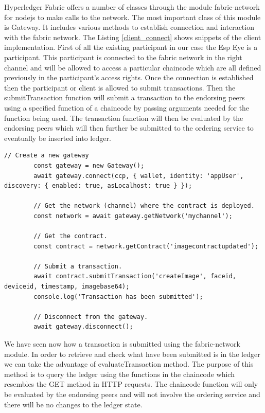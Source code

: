 Hyperledger Fabric offers a number of classes through the module {\selectfont fabric-network} for nodejs to make calls to the network. The most important class of this module is {\selectfont Gateway}. It includes various methods to establish connection and interaction with the fabric network. The Listing \ref{client_connect} shows snippets of the client implementation. First of all the existing participant in our case the Esp Eye is a participant. This participant is connected to the fabric network in the right channel and will be allowed to access a particular chaincode which are all defined previously in the participant's access rights. Once the connection is established then the participant or client is allowed to submit transactions. Then the {\selectfont submitTransaction} function will submit a transaction to the endorsing peers using a specified function of a chaincode by passing arguments needed for the function being used.  The transaction function will then be evaluated by the endorsing peers which will then further be submitted to the ordering service to eventually be inserted into ledger. 


\begin{lstlisting}[caption={Client establishing the connection and submitting a transaction.},label=client_connect, captionpos=b]
        // Create a new gateway 
        const gateway = new Gateway();
        await gateway.connect(ccp, { wallet, identity: 'appUser', discovery: { enabled: true, asLocalhost: true } });

        // Get the network (channel) where the contract is deployed.
        const network = await gateway.getNetwork('mychannel');

        // Get the contract.
        const contract = network.getContract('imagecontractupdated');

        // Submit a transaction.
        await contract.submitTransaction('createImage', faceid, deviceid, timestamp, imagebase64);
        console.log('Transaction has been submitted');

        // Disconnect from the gateway.
        await gateway.disconnect();
\end{lstlisting}

We have seen now how a transaction is submitted using the {\selectfont fabric-network} module. In order to retrieve and check what have been submitted is in the ledger we can take the advantage of {\selectfont evaluateTransaction} method. The purpose of this method is to query the ledger using the functions in the chaincode which resembles the GET method in HTTP requests. The chaincode function will only be evaluated by the endorsing peers and will not involve the ordering service and there will be no changes to the ledger state. 

